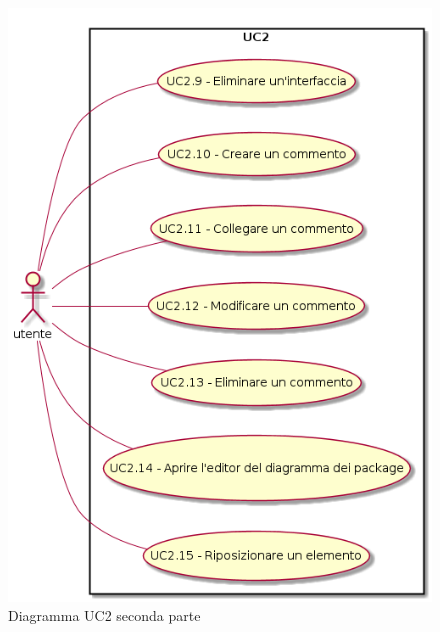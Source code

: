 \documentclass[../AnalisiDeiRequisiti.tex]{subfiles}
\begin{document}
	\begin{figure} [H]
		\centering
		\includegraphics[scale=0.45]{./Figures/UC2parte2.png}
		\caption{Diagramma UC2 seconda parte}\label{}
	\end{figure}
\end{document}
